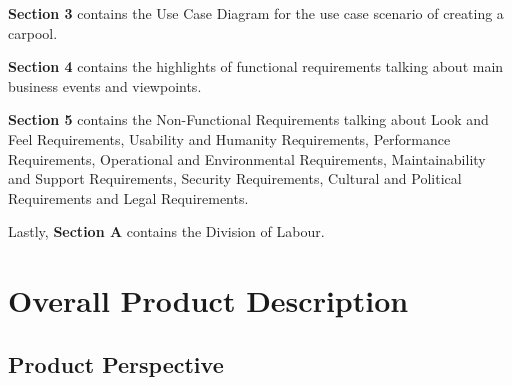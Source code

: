 \documentclass[]{article}
\begin{document}
\textbf{Section 3} contains the Use Case Diagram for the use case scenario of creating a carpool. 

\textbf{Section 4} contains the highlights of functional requirements talking about main business events and viewpoints. 

\textbf{Section 5} contains the Non-Functional Requirements talking about Look and Feel Requirements, Usability and Humanity Requirements, Performance Requirements, Operational and Environmental Requirements, Maintainability and Support Requirements, Security Requirements, Cultural and Political Requirements and Legal Requirements. 

Lastly, \textbf{Section A} contains the Division of Labour.


\newpage
\section{Overall Product Description}
\label{sec:overall_description}

\subsection{Product Perspective}
\label{sub:product_perspective}

\end{document}
